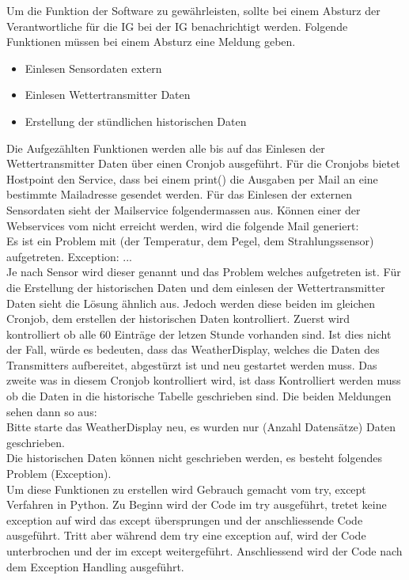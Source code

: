 Um die Funktion der Software zu gewährleisten, sollte bei einem Absturz der Verantwortliche für die IG bei der IG benachrichtigt werden. Folgende Funktionen müssen bei einem Absturz eine Meldung geben.
\begin{itemize}
\item Einlesen Sensordaten extern
\item Einlesen Wettertransmitter Daten
\item Erstellung der stündlichen historischen Daten
\end{itemize}
Die Aufgezählten Funktionen werden alle bis auf das Einlesen der Wettertransmitter Daten über einen Cronjob ausgeführt. Für die Cronjobs bietet Hostpoint den Service, dass bei einem print() die Ausgaben per Mail an eine bestimmte Mailadresse gesendet werden. Für das Einlesen der externen Sensordaten sieht der Mailservice folgendermassen aus. Können einer der Webservices vom  nicht erreicht werden, wird die folgende Mail generiert:\\
Es ist ein Problem mit (der Temperatur, dem Pegel, dem Strahlungssensor) aufgetreten. Exception: ...\\
Je nach Sensor wird dieser genannt und das Problem welches aufgetreten ist. Für die Erstellung der historischen Daten und dem einlesen der Wettertransmitter Daten sieht die Lösung ähnlich aus. Jedoch werden diese beiden im gleichen Cronjob, dem erstellen der historischen Daten kontrolliert. Zuerst wird kontrolliert ob alle 60 Einträge der letzen Stunde vorhanden sind. Ist dies nicht der Fall, würde es bedeuten, dass das WeatherDisplay, welches die Daten des Transmitters aufbereitet, abgestürzt ist und neu gestartet werden muss. Das zweite was in diesem Cronjob kontrolliert wird, ist dass Kontrolliert werden muss ob die Daten in die historische Tabelle geschrieben sind. Die beiden Meldungen sehen dann so aus:\\
Bitte starte das WeatherDisplay neu, es wurden nur (Anzahl Datensätze) Daten geschrieben.\\
Die historischen Daten können nicht geschrieben werden, es besteht folgendes Problem (Exception).\\

Um diese Funktionen zu erstellen wird Gebrauch gemacht vom try, except Verfahren in Python. Zu Beginn wird der Code im try ausgeführt, tretet keine exception auf wird das except übersprungen und der anschliessende Code ausgeführt. Tritt aber während dem try eine exception auf, wird der Code unterbrochen und der im except weitergeführt. Anschliessend wird der Code nach dem Exception Handling ausgeführt.\cite{ThePythonTutorial8.ErrorsAndExceptions:Python}
